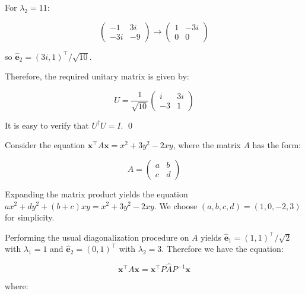 \documentclass[12pt]{article}
\begin{document}
For $\lambda_{2} = 11$:

\begin{equation}
    \begin{pmatrix}
        -1  & 3i \\
        -3i & -9
    \end{pmatrix}
    \to
    \begin{pmatrix}
        1 & -3i \\
        0 & 0
    \end{pmatrix}
\end{equation}

so $\hat{\mathbf{e}}_{2} = (3i, 1)^{\intercal}/\sqrt{10}$.

Therefore, the required unitary matrix is given by:

\begin{equation}
    U = \frac{1}{\sqrt{10}}
    \begin{pmatrix}
        i  & 3i \\
        -3 & 1
    \end{pmatrix}
\end{equation}

It is easy to verify that $U^{\dagger}U = I$.
\qed



Consider the equation $\mathbf{x}^{\intercal} A \mathbf{x} = x^{2} + 3y^{2} - 2xy$, where the matrix $A$ has the form:

\begin{equation}
    A = \begin{pmatrix}
        a & b \\
        c & d
    \end{pmatrix}
\end{equation}

Expanding the matrix product yields the equation $ax^{2} + dy^{2} + (b+c)xy = x^{2} + 3y^{2} - 2xy$. We choose $(a, b, c, d) = (1, 0, -2, 3)$ for simplicity.

Performing the usual diagonalization procedure on $A$ yields $\hat{\mathbf{e}}_{1} = (1, 1)^{\intercal}/\sqrt{2}$ with $\lambda_{1} = 1$ and $\hat{\mathbf{e}}_{2} = (0, 1)^{\intercal}$ with $\lambda_{2} = 3$. Therefore we have the equation:

\begin{equation}
    \mathbf{x}^{\intercal} A \mathbf{x} = \mathbf{x}^{\intercal} P \hat{A} P^{-1} \mathbf{x}
\end{equation}

where:
\end{document}
